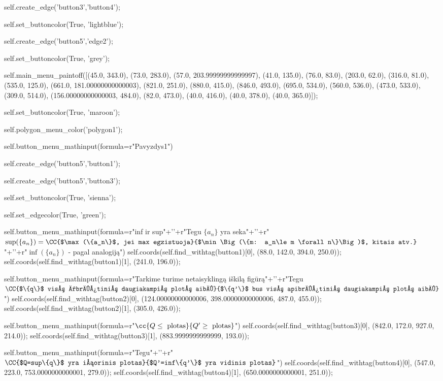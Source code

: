 self.create_edge('button3','button4');

self.set_buttoncolor(True, 'lightblue');


self.create_edge('button5','edge2');

self.set_buttoncolor(True, 'grey');

self.main_menu_paintoff([(45.0, 343.0), (73.0, 283.0), (57.0, 203.99999999999997), (41.0, 135.0), (76.0, 83.0), (203.0, 62.0), (316.0, 81.0), (535.0, 125.0), (661.0, 181.00000000000003), (821.0, 251.0), (880.0, 415.0), (846.0, 493.0), (695.0, 534.0), (560.0, 536.0), (473.0, 533.0), (309.0, 514.0), (156.00000000000003, 484.0), (82.0, 473.0), (40.0, 416.0), (40.0, 378.0), (40.0, 365.0)]);

self.set_buttoncolor(True, 'maroon');

self.polygon_menu_color('polygon1');

self.button_menu_mathinput(formula=r"Pavyzdys1")

self.create_edge('button5','button1');

self.create_edge('button5','button3');


self.set_buttoncolor(True, 'sienna');

self.set_edgecolor(True, 'green');

self.button_menu_mathinput(formula=r"\Huge inf ir sup"+'\n'+r"Tegu $\{a_n\}$ yra seka"+'\n'+r"$\sup(\{a_n\})=\CC{$\max(\{a_n\}$, jei max egzistuoja}{$\min\Big(\{m: a_n\le m \forall n\}\Big)$, kitais atv.}$"+'\n'+r"$\inf(\{a_n\})$ - pagal analogiją")
self.coords(self.find_withtag(button1)[0], (88.0, 142.0, 394.0, 250.0));
self.coords(self.find_withtag(button1)[1], (241.0, 196.0));

self.button_menu_mathinput(formula=r"Tarkime turime netaisyklingą iškilą figūrą"+'\n'+r"Tegu $\CC{$\{q\}$ visų įbrėžtinių daugiakampių plotų aibė}{$\{q'\}$ bus visų apibrėžtinių daugiakampių plotų aibė}$")
self.coords(self.find_withtag(button2)[0], (124.00000000000006, 398.00000000000006, 487.0, 455.0));
self.coords(self.find_withtag(button2)[1], (305.0, 426.0));

self.button_menu_mathinput(formula=r"$\cc{Q \le \text{ plotas}}{Q' \ge\text{ plotas}}$")
self.coords(self.find_withtag(button3)[0], (842.0, 172.0, 927.0, 214.0));
self.coords(self.find_withtag(button3)[1], (883.9999999999999, 193.0));

self.button_menu_mathinput(formula=r"Tegu"+'\n'+r"$\CC{$Q=sup\{q\}$ yra išorinis plotas}{$Q'=inf\{q'\}$ yra vidinis plotas}$")
self.coords(self.find_withtag(button4)[0], (547.0, 223.0, 753.0000000000001, 279.0));
self.coords(self.find_withtag(button4)[1], (650.0000000000001, 251.0));

